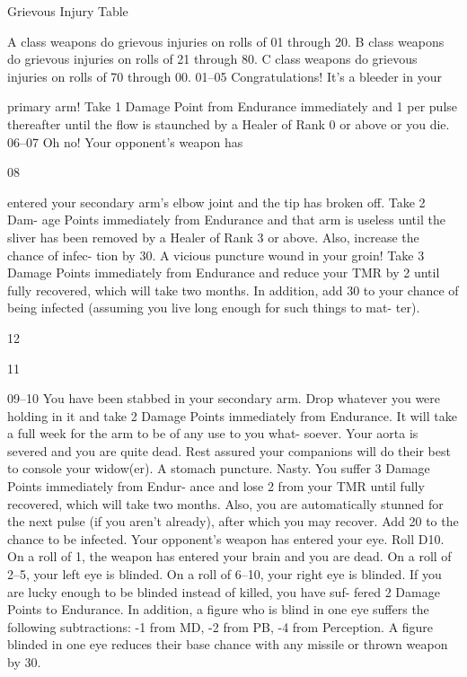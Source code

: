 \begin{Chapter}{Grievous Injury Table}

A class weapons do grievous injuries on rolls of 01 
through 20.  
B class weapons do grievous injuries on rolls of 21 
through 80.  
C class weapons do grievous injuries on rolls of 70 
through 00. 
01–05   Congratulations! It’s a bleeder in your 

primary arm! Take 1 Damage Point from 
Endurance immediately and 1 per pulse 
thereafter until the flow is staunched by a 
Healer of Rank 0 or above or you die. 
06–07   Oh no! Your opponent’s weapon has 

08  

entered your secondary arm’s elbow joint 
and the tip has broken off. Take 2 Dam-
age Points immediately from Endurance 
and that arm is useless until the sliver has 
been removed by a Healer of Rank 3 or 
above. Also, increase the chance of infec-
tion by 30. 
A vicious puncture wound in your groin! 
Take 3 Damage Points immediately from 
Endurance and reduce your TMR by 2 
until fully recovered, which will take two 
months. In addition, add 30 to your 
chance of being infected (assuming you 
live long enough for such things to mat-
ter). 

12  

11  

09–10   You have been stabbed in your secondary 
arm. Drop whatever you were holding in 
it and take 2 Damage Points immediately 
from Endurance. It will take a full week 
for the arm to be of any use to you what-
soever. 
Your aorta is severed and you are quite 
dead. Rest assured your companions will 
do their best to console your widow(er). 
A stomach puncture. Nasty. You suffer 3 
Damage Points immediately from Endur-
ance and lose 2 from your TMR until 
fully recovered, which will take two 
months. Also, you are automatically 
stunned for the next pulse (if you aren’t 
already), after which you may recover. 
Add 20 to the chance to be infected. 
Your opponent’s weapon has entered your 
eye. Roll D10. On a roll of 1, the weapon 
has entered your brain and you are dead. 
On a roll of 2–5, your left eye is blinded. 
On a roll of 6–10, your right eye is 
blinded. If you are lucky enough to be 
blinded instead of killed, you have suf-
fered 2 Damage Points to Endurance. In 
addition, a figure who is blind in one eye 
suffers the following subtractions: -1 from 
MD, -2 from PB, -4 from Perception. A 
figure blinded in one eye reduces their 
base chance with any missile or thrown 
weapon by 30. 


\end{Chapter}
